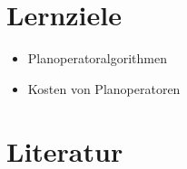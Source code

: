 \section*{Lernziele}
\begin{itemize}
	\item Planoperatoralgorithmen
	\item Kosten von Planoperatoren
\end{itemize}


\section*{Literatur}


